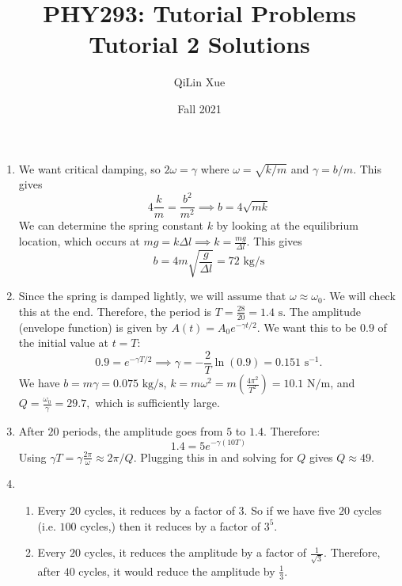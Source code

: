 \documentclass{article}
\title{PHY293: Tutorial Problems \\ \textbf{Tutorial 2 Solutions}}
\author{QiLin Xue}
\date{Fall 2021}
\begin{document}
\maketitle
\begin{enumerate}
    \item We want critical damping, so $2\omega = \gamma$ where $\omega=\sqrt{k/m}$ and $\gamma=b/m$. This gives 
    \begin{equation}
        4\frac{k}{m} =  \frac{b^2}{m^2} \implies b = 4\sqrt{mk}
    \end{equation}
    We can determine the spring constant $k$ by looking at the equilibrium location, which occurs at $mg=k\Delta l \implies k = \frac{mg}{\Delta l}$. This gives 
    \begin{equation}
        b = 4m\sqrt{\frac{g}{\Delta l}} = \boxed{\text{72 kg/s}}
    \end{equation}
    \item Since the spring is damped lightly, we will assume that $\omega \approx \omega_0$. We will check this at the end. Therefore, the period is $T = \frac{28}{20} = 1.4\text{ s}$. The amplitude (envelope function) is given by $A(t) = A_0 e^{-\gamma t/2}.$ We want this to be $0.9$ of the initial value at $t=T$: 
    \begin{equation}
        0.9 = e^{-\gamma T/2} \implies \gamma = -\frac{2}{T}\ln(0.9) = 0.151\text{ s}^{-1}.
    \end{equation} 
    We have $b=m\gamma = 0.075\text{ kg/s}$, $k = m\omega^2 = m\left(\frac{4\pi^2}{T^2}\right) = 10.1 \text{ N/m}$, and $Q=\frac{\omega_0}{\gamma} = 29.7,$ which is sufficiently large.
    \item After $20$ periods, the amplitude goes from $5$ to $1.4$. Therefore: 
    \begin{equation}
        1.4 = 5e^{-\gamma(10 T)}
    \end{equation}
    Using $\gamma T = \gamma \frac{2\pi}{\omega} \approx 2\pi/Q.$ Plugging this in and solving for $Q$ gives $Q\approx 49.$
    \item \begin{enumerate}
        \item Every $20$ cycles, it reduces by a factor of $3$. So if we have five $20$ cycles (i.e. $100$ cycles,) then it reduces by a factor of $3^5.$
        \item Every $20$ cycles, it reduces the amplitude by a factor of $\frac{1}{\sqrt{3}}$. Therefore, after $40$ cycles, it would reduce the amplitude by $\frac{1}{3}$.
    \end{enumerate}

\end{enumerate}
\end{document}
